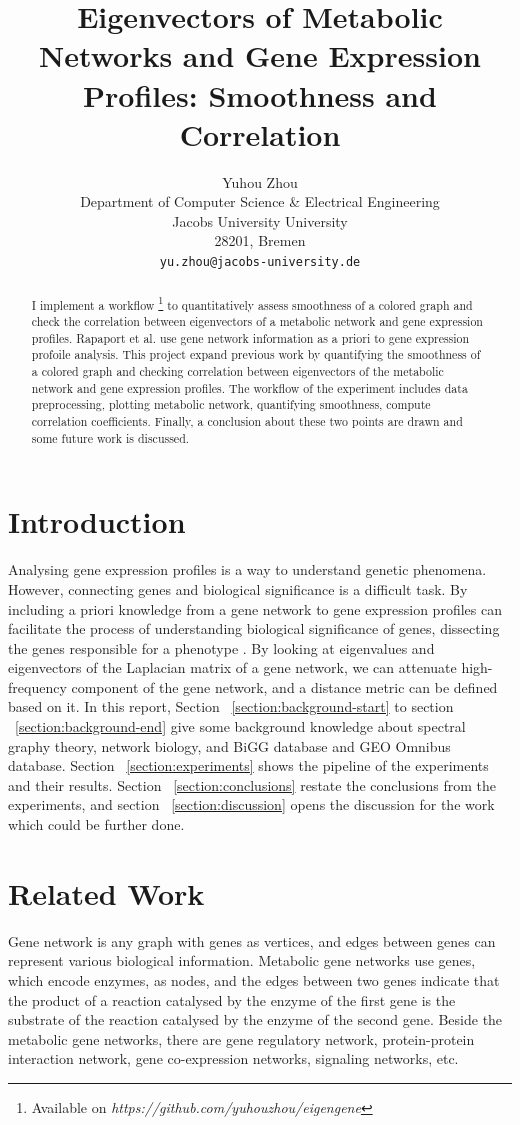 \documentclass{article} %
\title{Eigenvectors of Metabolic Networks and Gene Expression Profiles: Smoothness and Correlation}
\author{
Yuhou Zhou\\
Department of Computer Science \& Electrical Engineering\\
Jacobs University University\\
28201, Bremen \\
\texttt{yu.zhou@jacobs-university.de} \\
}
\begin{document}
\maketitle

\begin{abstract}
 I implement a workflow \footnote{Available on \textit{https://github.com/yuhouzhou/eigengene}} to quantitatively assess smoothness of a colored graph and check the correlation between eigenvectors of a metabolic network and gene expression profiles. Rapaport et al. use gene network information as a priori to gene expression profoile analysis. This project expand previous work by quantifying the smoothness of a colored graph and checking correlation between eigenvectors of the metabolic network and gene expression profiles. The workflow of the experiment includes data preprocessing, plotting metabolic network, quantifying smoothness, compute correlation coefficients. Finally, a conclusion about these two points are drawn and some future work is discussed. 
\end{abstract}

\section{Introduction}
Analysing gene expression profiles is a way to understand genetic phenomena. However, connecting genes and biological significance is a difficult task. By including a priori knowledge from a gene network to gene expression profiles can facilitate the process of understanding biological significance of genes, dissecting the genes responsible for a phenotype \cite{rapaport_classification_2007}. By looking at eigenvalues and eigenvectors of the Laplacian matrix of a gene network, we can attenuate high-frequency component of the gene network, and a distance metric can be defined based on it. In this report, Section ~\ref{section:background-start} to section ~\ref{section:background-end} give some background knowledge about spectral graphy theory, network biology, and BiGG database and GEO Omnibus database. Section ~\ref{section:experiments} shows the pipeline of the experiments and their results. Section ~\ref{section:conclusions} restate the conclusions from the experiments, and section ~\ref{section:discussion} opens the discussion for the work which could be further done.

\section{Related Work}
Gene network is any graph with genes as vertices, and edges between genes can represent various biological information. Metabolic gene networks use genes, which encode enzymes, as nodes, and the edges between two genes indicate that the product of a reaction catalysed by the enzyme of the first gene is the substrate of the reaction catalysed by the enzyme of the second gene. Beside the metabolic gene networks, there are gene regulatory network, protein-protein interaction network, gene co-expression networks, signaling networks, etc.
\end{document}
